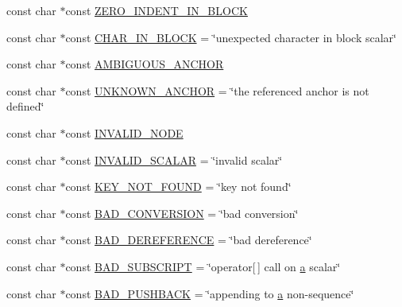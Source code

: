 \begin{DoxyCompactItemize}
\item 
const char $\ast$const \mbox{\hyperlink{namespace_y_a_m_l_1_1_error_msg_a255b61b9018a44d49573f11833b95ded}{Z\+E\+R\+O\+\_\+\+I\+N\+D\+E\+N\+T\+\_\+\+I\+N\+\_\+\+B\+L\+O\+CK}}
\item 
const char $\ast$const \mbox{\hyperlink{namespace_y_a_m_l_1_1_error_msg_a044e2c16e807e2b998c1c6dc5323a259}{C\+H\+A\+R\+\_\+\+I\+N\+\_\+\+B\+L\+O\+CK}} = \char`\"{}unexpected character in block scalar\char`\"{}
\item 
const char $\ast$const \mbox{\hyperlink{namespace_y_a_m_l_1_1_error_msg_ab1ee60076319b3a659c456f65c97ce61}{A\+M\+B\+I\+G\+U\+O\+U\+S\+\_\+\+A\+N\+C\+H\+OR}}
\item 
const char $\ast$const \mbox{\hyperlink{namespace_y_a_m_l_1_1_error_msg_a0ccf3b2a3a6bd245ce36786680a1c66a}{U\+N\+K\+N\+O\+W\+N\+\_\+\+A\+N\+C\+H\+OR}} = \char`\"{}the referenced anchor is not defined\char`\"{}
\item 
const char $\ast$const \mbox{\hyperlink{namespace_y_a_m_l_1_1_error_msg_a8fdac3b0873c80d8e79bd926dda2f2d7}{I\+N\+V\+A\+L\+I\+D\+\_\+\+N\+O\+DE}}
\item 
const char $\ast$const \mbox{\hyperlink{namespace_y_a_m_l_1_1_error_msg_a030aa772ab2a85cbe58129c647a9fc58}{I\+N\+V\+A\+L\+I\+D\+\_\+\+S\+C\+A\+L\+AR}} = \char`\"{}invalid scalar\char`\"{}
\item 
const char $\ast$const \mbox{\hyperlink{namespace_y_a_m_l_1_1_error_msg_a8f71004902c48f0ca0a471c73bc483c7}{K\+E\+Y\+\_\+\+N\+O\+T\+\_\+\+F\+O\+U\+ND}} = \char`\"{}key not found\char`\"{}
\item 
const char $\ast$const \mbox{\hyperlink{namespace_y_a_m_l_1_1_error_msg_a720cf08bf5993a065fc72b16da4ed8aa}{B\+A\+D\+\_\+\+C\+O\+N\+V\+E\+R\+S\+I\+ON}} = \char`\"{}bad conversion\char`\"{}
\item 
const char $\ast$const \mbox{\hyperlink{namespace_y_a_m_l_1_1_error_msg_a9a6b8dedbdae4130488ffddd02db26e7}{B\+A\+D\+\_\+\+D\+E\+R\+E\+F\+E\+R\+E\+N\+CE}} = \char`\"{}bad dereference\char`\"{}
\item 
const char $\ast$const \mbox{\hyperlink{namespace_y_a_m_l_1_1_error_msg_afd848e3c4478da335bb779a92a94691e}{B\+A\+D\+\_\+\+S\+U\+B\+S\+C\+R\+I\+PT}} = \char`\"{}operator\mbox{[}$\,$\mbox{]} call on \mbox{\hyperlink{glad_8h_ac8729153468b5dcf13f971b21d84d4e5}{a}} scalar\char`\"{}
\item 
const char $\ast$const \mbox{\hyperlink{namespace_y_a_m_l_1_1_error_msg_afc4f10ac963dc01d9a4eaa6fb954bb5b}{B\+A\+D\+\_\+\+P\+U\+S\+H\+B\+A\+CK}} = \char`\"{}appending to \mbox{\hyperlink{glad_8h_ac8729153468b5dcf13f971b21d84d4e5}{a}} non-\/sequence\char`\"{}

\end{DoxyCompactItemize}
